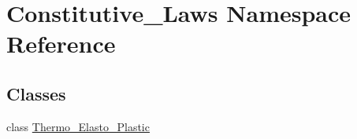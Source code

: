 \hypertarget{namespaceConstitutive__Laws}{}\section{Constitutive\+\_\+\+Laws Namespace Reference}
\label{namespaceConstitutive__Laws}
\subsection*{Classes}
\begin{DoxyCompactItemize}
\item 
class \hyperlink{classConstitutive__Laws_1_1Thermo__Elasto__Plastic}{Thermo\+\_\+\+Elasto\+\_\+\+Plastic}
\end{DoxyCompactItemize}
